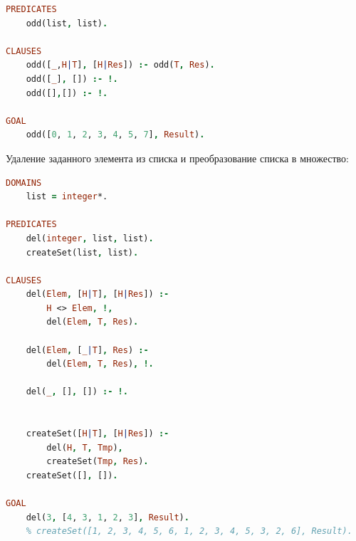 \documentclass[a4paper,oneside,12pt]{extreport}
\begin{document}
\begin{task}
\begin{lstlisting}[language=Prolog]
    PREDICATES
    odd(list, list).
    
CLAUSES
    odd([_,H|T], [H|Res]) :- odd(T, Res).
    odd([_], []) :- !.
    odd([],[]) :- !.
    
GOAL
    odd([0, 1, 2, 3, 4, 5, 7], Result).
    \end{lstlisting}

    \begin{figure}[ht!]
    \end{figure}


    Удаление заданного элемента из списка и преобразование списка в множество:
    \begin{lstlisting}[language=Prolog]
DOMAINS
    list = integer*.

PREDICATES
    del(integer, list, list).
    createSet(list, list).

CLAUSES
    del(Elem, [H|T], [H|Res]) :- 
        H <> Elem, !,
        del(Elem, T, Res).
        
    del(Elem, [_|T], Res) :-
        del(Elem, T, Res), !.
    
    del(_, [], []) :- !.
    
    
    createSet([H|T], [H|Res]) :-
        del(H, T, Tmp),
        createSet(Tmp, Res).
    createSet([], []).

GOAL
    del(3, [4, 3, 1, 2, 3], Result).
    % createSet([1, 2, 3, 4, 5, 6, 1, 2, 3, 4, 5, 3, 2, 6], Result).
    \end{lstlisting}
        
    \begin{figure}[ht!]
    \end{figure}

    \begin{figure}[ht!]
    \end{figure}

\end{task}

\newpage
\end{document}
